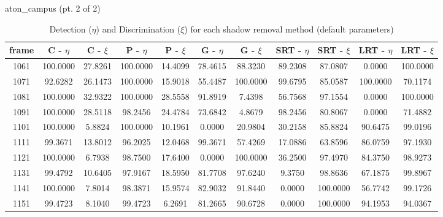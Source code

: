 \begin{appendices}
\begin{table}
\begin{tabular}{ |c|c|c|c|c|c|c|c|c|c|c| }
\hline
\end{tabular}

\end{table}

\begin{table}
\centering
\caption{aton\_campus (pt. 2 of 2)}
\caption*{Detection ($\eta$) and Discrimination ($\xi$) for each shadow removal method (default parameters)}
\begin{tabular}{ |c|c|c|c|c|c|c|c|c|c|c| }
	\hline
\textbf{frame} &  \textbf{C - $\eta$} &  \textbf{C - $\xi$} &  \textbf{P - $\eta$} &  \textbf{P - $\xi$} &  \textbf{G - $\eta$} &  \textbf{G - $\xi$} &  \textbf{SRT - $\eta$} &  \textbf{SRT - $\xi$} &  \textbf{LRT - $\eta$} &  \textbf{LRT - $\xi$} \\
\hline
\hline
1061 &  100.0000 &  27.8261 &   100.0000 &  14.4099 &   78.4615 &  88.3230 &   89.2308 &  87.0807 &   0.0000 &  100.0000    \\
\hline
1071 &  92.6282 &  26.1473 &   100.0000 &  15.9018 &   55.4487 &  100.0000 &   99.6795 &  85.0587 &   100.0000 &  70.1174    \\
\hline
1081 &  100.0000 &  32.9322 &   100.0000 &  28.5558 &   91.8919 &  7.4398 &   56.7568 &  97.1554 &   0.0000 &  100.0000   \\
\hline
1091 &  100.0000 &  28.5118 &   98.2456 &  24.4784 &   73.6842 &  4.8679 &   98.2456 &  80.8067 &   0.0000 &  71.4882    \\
\hline
1101 &  100.0000 &  5.8824 &   100.0000 &  10.1961 &   0.0000 &  20.9804 &   30.2158 &  85.8824 &   90.6475 &  99.0196    \\
\hline
1111 &  99.3671 &  13.8012 &   96.2025 &  12.0468 &   99.3671 &  57.4269 &   17.0886 &  63.8596 &   86.0759 &  97.1930    \\
\hline
1121 &  100.0000 &  6.7938 &   98.7500 &  17.6400 &   0.0000 &  100.0000 &   36.2500 &  97.4970 &   84.3750 &  98.9273    \\
\hline
1131 &  99.4792 &  10.6405 &   97.9167 &  18.5950 &   81.7708 &  97.6240 &   9.3750 &  98.8636 &   67.1875 &  99.8967    \\
\hline
1141 &  100.0000 &  7.8014 &   98.3871 &  15.9574 &   82.9032 &  91.8440 &   0.0000 &  100.0000 &   56.7742 &  99.1726   \\
\hline
1151 &  99.4723 &  8.1040 &   99.4723 &  6.2691 &   81.2665 &  90.6728 &   0.0000 &  100.0000 &   94.1953 &  94.0367   \\

\hline
\end{tabular}


\end{table}
\end{appendices}
